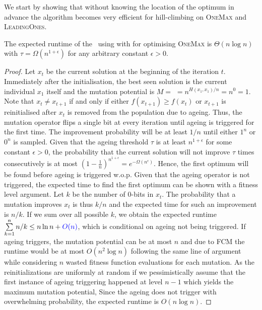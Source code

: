 \documentclass[lettersize,journal]{IEEEtran}
\begin{document}
We start by showing that without knowing the location of the optimum in advance the algorithm becomes very efficient for hill-climbing on \textsc{OneMax} and \textsc{LeadingOnes}.

\begin{theorem} \label{thm:onemaxexpo}
The expected runtime of the \oneoneOPTIA~using \IPHfcm{}  with {\expoHD } for optimising
\textsc{OneMax} is $\Theta(n\log n)$ with $\tau=\Omega(n^{1+\epsilon})$ {\color{blue}for any arbitrary} constant $\epsilon>0$.
\end{theorem}
\begin{proof}
Let $x_t$ be the current solution at the beginning of the iteration $t$. Immediately after the initialisation, the best seen solution is the current individual $x_1$ itself and the mutation potential is $M=$ {\expoHD }$=n^{H(x_1,x_1)/n}=n^0=1$. Note that  $x_t \neq x_{t+1}$ if and only if either $f(x_{t+1})\geq f(x_t)$ or $x_{t+1}$ is reinitialised after $x_t$ is removed from the population due to ageing. Thus, the mutation operator flips a single bit at every iteration until ageing is triggered for the first time.
The improvement probability will be at least $ 1/n $ until either $1^n$ or $0^n$ is sampled. 
Given that the ageing threshold $\tau$  is at least $n^{1+\epsilon}$ for some constant $\epsilon >0 $, 
the probability that the current solution will not improve $\tau$ times consecutively is at most 
$(1-\frac{1}{n})^{n^{1+\epsilon}}=e^{-\Omega(n^\epsilon)}$. 
Hence, the first optimum will be found before ageing is triggered w.o.p. Given that the ageing operator is not triggered, the expected time to find the first optimum can be shown with a fitness level argument. Let $k$ be the number of $0$-bits in $x_t$. The probability that a mutation improves $x_t$ is thus $k/n$ and the expected time for such an improvement is $n/k$. If we sum over all possible $k$, we obtain the expected runtime $\sum\limits_{k=1}^{n}n/k \leq n \ln n + {\color{blue}O(n) } $, which is conditional on ageing not being triggered. If ageing triggers, the mutation potential can be at most $n$ and due to FCM the runtime would be at most $O(n^2 \log n)$ following the same line of argument while considering $n$ wasted fitness function evaluations for each mutation. As the reinitializations are uniformly at random if we pessimistically assume that the first instance of ageing triggering happened at level $n-1$ which yields the maximum mutation potential,  Since the ageing does not trigger with overwhelming probability, the expected runtime is $O(n \log{n})$.


\end{proof}
\end{document}
